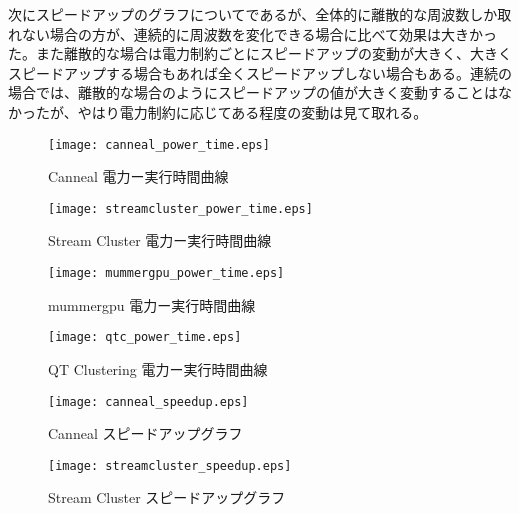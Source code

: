次にスピードアップのグラフについてであるが、全体的に離散的な周波数しか取れない場合の方が、連続的に周波数を変化できる場合に比べて効果は大きかった。また離散的な場合は電力制約ごとにスピードアップの変動が大きく、大きくスピードアップする場合もあれば全くスピードアップしない場合もある。連続の場合では、離散的な場合のようにスピードアップの値が大きく変動することはなかったが、やはり電力制約に応じてある程度の変動は見て取れる。

\begin{figure}[t]
 \begin{center}
  \texttt{[image: canneal\_power\_time.eps]}
 \end{center}
 \caption{Canneal 電力ー実行時間曲線}
 \label{fig:canneal_power_time}
\end{figure}

\begin{figure}[t]
 \begin{center}
  \texttt{[image: streamcluster\_power\_time.eps]}
 \end{center}
 \caption{Stream Cluster 電力ー実行時間曲線}
 \label{fig:streamcluster_power_time}
\end{figure}

\begin{figure}[t]
 \begin{center}
  \texttt{[image: mummergpu\_power\_time.eps]}
 \end{center}
 \caption{mummergpu 電力ー実行時間曲線}
 \label{fig:mummergpu_power_time}
\end{figure}

\begin{figure}[t]
 \begin{center}
  \texttt{[image: qtc\_power\_time.eps]}
 \end{center}
 \caption{QT Clustering 電力ー実行時間曲線}
 \label{fig:qtclustering_power_time}
\end{figure}

\begin{figure}[t]
 \begin{center}
  \texttt{[image: canneal\_speedup.eps]}
 \end{center}
 \caption{Canneal スピードアップグラフ}
 \label{fig:canneal_speedup}
\end{figure}

\begin{figure}[t]
 \begin{center}
  \texttt{[image: streamcluster\_speedup.eps]}
 \end{center}
 \caption{Stream Cluster スピードアップグラフ}
 \label{fig:streamcluster_speedup}
\end{figure}

